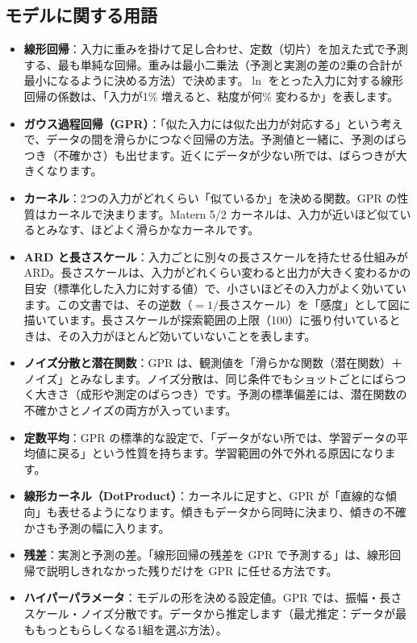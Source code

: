 \documentclass[paper=a4paper,fontsize=10.5pt,line_length=44zw,number_of_lines=38]{jlreq}
\newenvironment{termlist}{\begin{itemize}[label=・,leftmargin=1\zw,labelwidth=1\zw,labelsep=0pt,itemsep=0.4ex,topsep=0.6ex,parsep=0pt]}{\end{itemize}}
\newcommand{\term}[1]{\item \textbf{#1}：}
\begin{document}
\subsection{モデルに関する用語}
\begin{termlist}
\term{線形回帰}入力に重みを掛けて足し合わせ、定数（切片）を加えた式で予測する、最も単純な回帰。重みは最小二乗法（予測と実測の差の2乗の合計が最小になるように決める方法）で決めます。$\ln$ をとった入力に対する線形回帰の係数は、「入力が1\% 増えると、粘度が何\% 変わるか」を表します。
\term{ガウス過程回帰（GPR）}「似た入力には似た出力が対応する」という考えで、データの間を滑らかにつなぐ回帰の方法。予測値と一緒に、予測のばらつき（不確かさ）も出せます。近くにデータが少ない所では、ばらつきが大きくなります。
\term{カーネル}2つの入力がどれくらい「似ているか」を決める関数。GPR の性質はカーネルで決まります。Matern 5/2 カーネルは、入力が近いほど似ているとみなす、ほどよく滑らかなカーネルです。
\term{ARD と長さスケール}入力ごとに別々の長さスケールを持たせる仕組みが ARD。長さスケールは、入力がどれくらい変わると出力が大きく変わるかの目安（標準化した入力に対する値）で、小さいほどその入力がよく効いています。この文書では、その逆数（$=1/$長さスケール）を「感度」として図に描いています。長さスケールが探索範囲の上限（100）に張り付いているときは、その入力がほとんど効いていないことを表します。
\term{ノイズ分散と潜在関数}GPR は、観測値を「滑らかな関数（潜在関数）＋ノイズ」とみなします。ノイズ分散は、同じ条件でもショットごとにばらつく大きさ（成形や測定のばらつき）です。予測の標準偏差には、潜在関数の不確かさとノイズの両方が入っています。
\term{定数平均}GPR の標準的な設定で、「データがない所では、学習データの平均値に戻る」という性質を持ちます。学習範囲の外で外れる原因になります。
\term{線形カーネル（DotProduct）}カーネルに足すと、GPR が「直線的な傾向」も表せるようになります。傾きもデータから同時に決まり、傾きの不確かさも予測の幅に入ります。
\term{残差}実測と予測の差。「線形回帰の残差を GPR で予測する」は、線形回帰で説明しきれなかった残りだけを GPR に任せる方法です。
\term{ハイパーパラメータ}モデルの形を決める設定値。GPR では、振幅・長さスケール・ノイズ分散です。データから推定します（最尤推定：データが最ももっともらしくなる1組を選ぶ方法）。
\end{termlist}
\end{document}
